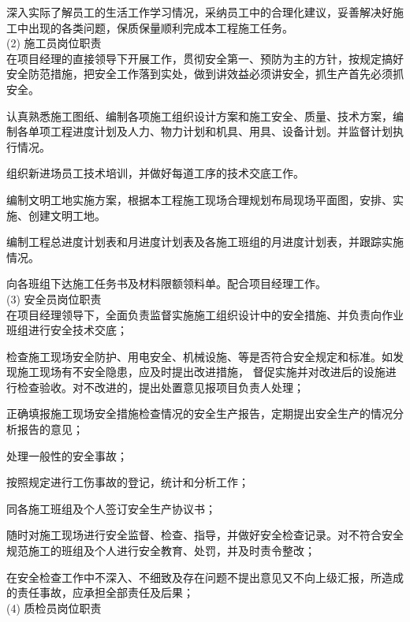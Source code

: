  深入实际了解员工的生活工作学习情况，采纳员工中的合理化建议，妥善解决好施工中出现的各类问题，保质保量顺利完成本工程施工任务。\\

(2) 施工员岗位职责\\

 在项目经理的直接领导下开展工作，贯彻安全第一、预防为主的方针，按规定搞好安全防范措施，把安全工作落到实处，做到讲效益必须讲安全，抓生产首先必须抓安全。

 认真熟悉施工图纸、编制各项施工组织设计方案和施工安全、质量、技术方案，编制各单项工程进度计划及人力、物力计划和机具、用具、设备计划。并监督计划执行情况。

 组织新进场员工技术培训，并做好每道工序的技术交底工作。

 编制文明工地实施方案，根据本工程施工现场合理规划布局现场平面图，安排、实施、创建文明工地。

 编制工程总进度计划表和月进度计划表及各施工班组的月进度计划表，并跟踪实施情况。

 向各班组下达施工任务书及材料限额领料单。配合项目经理工作。\\

(3) 安全员岗位职责\\

 在项目经理领导下，全面负责监督实施施工组织设计中的安全措施、并负责向作业班组进行安全技术交底；

 检查施工现场安全防护、用电安全、机械设施、等是否符合安全规定和标准。如发现施工现场有不安全隐患，应及时提出改进措施，
督促实施并对改进后的设施进行检查验收。对不改进的，提出处置意见报项目负责人处理；

 正确填报施工现场安全措施检查情况的安全生产报告，定期提出安全生产的情况分析报告的意见；

 处理一般性的安全事故；

 按照规定进行工伤事故的登记，统计和分析工作；

 同各施工班组及个人签订安全生产协议书；

 随时对施工现场进行安全监督、检查、指导，并做好安全检查记录。对不符合安全规范施工的班组及个人进行安全教育、处罚，并及时责令整改；

 在安全检查工作中不深入、不细致及存在问题不提出意见又不向上级汇报，所造成的责任事故，应承担全部责任及后果；\\

(4) 质检员岗位职责\\

